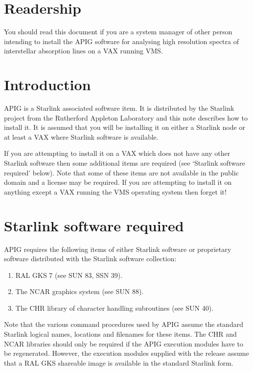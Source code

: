 \section{Readership}

You should read this document if you are a system manager of other 
person intending to install the APIG software for analysing high
resolution spectra of interstellar absorption lines on a VAX running 
VMS.

\section{Introduction}

APIG is a Starlink associated software item. It is distributed by the
Starlink project from the Rutherford Appleton Laboratory and this note
describes how to install it. It is assumed that you will be installing
it on either a Starlink node or at least a VAX where Starlink software
is available.

If you are attempting to install it on a VAX which does not have any 
other Starlink software then some additional items are required (see
`Starlink software required' below). Note that some of these items are
not available in the public domain and a license may be required. If you
are attempting to install it on anything except a VAX running the VMS
operating system then forget it!

\section{Starlink software required}

APIG requires the following items of either Starlink software or 
proprietary software distributed with the Starlink software collection:

\begin{enumerate}

  \item RAL GKS 7 (see SUN 83, SSN 39).

  \item The NCAR graphics system (see SUN 88).

  \item The CHR library of character handling subroutines (see SUN 40).

\end{enumerate}

Note that the various command procedures used by APIG assume the 
standard Starlink logical names, locations and filenames for these 
items. The CHR and NCAR libraries should only be required if the APIG
execution modules have to be regenerated. However, the execution 
modules supplied with the release assume that a RAL GKS shareable
image is available in the standard Starlink form.

